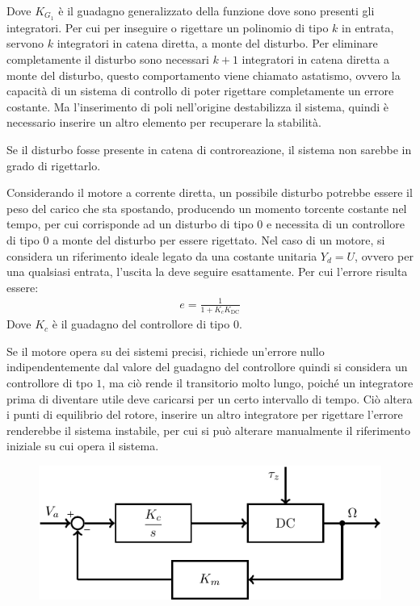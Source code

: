 \documentclass{article}
\numberwithin{equation}{subsection}
\begin{document}
Dove $K_{G_1}$ è il guadagno generalizzato della funzione dove sono presenti gli integratori. 
Per cui per inseguire o rigettare un polinomio di tipo $k$ in entrata, servono $k$ integratori in catena diretta, a monte del disturbo. 
Per eliminare completamente il disturbo sono necessari $k+1$ integratori in catena diretta a monte del disturbo, questo comportamento viene chiamato astatismo, ovvero 
la capacità di un sistema di controllo di poter rigettare completamente un errore costante. Ma l'inserimento di poli nell'origine 
destabilizza il sistema, quindi è necessario inserire un altro elemento per recuperare la stabilità. 

Se il disturbo fosse presente in catena di controreazione, il sistema non sarebbe in grado di rigettarlo. 



Considerando il motore a corrente diretta, un possibile disturbo potrebbe essere il peso del carico che sta spostando, producendo un momento torcente costante nel tempo, 
per cui corrisponde ad un disturbo di tipo $0$ e necessita di un controllore di tipo $0$ a monte del disturbo per essere rigettato. Nel caso di un motore, si considera un riferimento ideale legato da 
una costante unitaria $Y_d=U$, ovvero per una qualsiasi entrata, l'uscita la deve seguire esattamente. Per cui l'errore risulta essere: 
\begin{gather*}
    e=\displaystyle\frac{1}{1+K_cK_{\mathrm{DC}}}
\end{gather*}
Dove $K_c$ è il guadagno del controllore di tipo $0$. 



Se il motore opera su dei sistemi precisi, richiede un'errore nullo 
indipendentemente dal valore del guadagno del controllore quindi si considera un controllore di tpo $1$, ma ciò rende il transitorio molto lungo, poiché un integratore 
prima di diventare utile deve caricarsi per un certo intervallo di tempo. Ciò altera i punti di equilibrio del rotore, inserire un 
altro integratore per rigettare l'errore renderebbe il sistema instabile, per cui si può alterare manualmente il riferimento iniziale su cui opera il sistema. 

\begin{figure}[H]%
    \centering
    \includegraphics{disturbo-motore.pdf}%
\end{figure}
\end{document}
